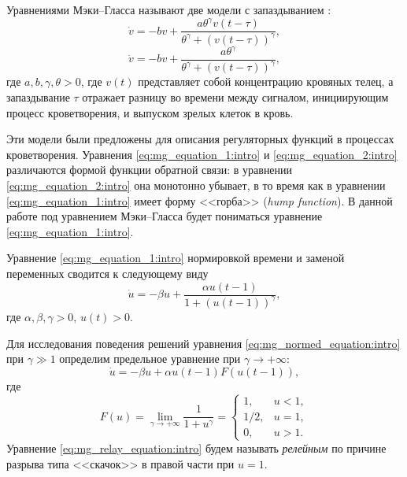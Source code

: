 

{\actuality} Уравнениями Мэки--Гласса называют две модели с запаздыванием \cite{Mackey1977, Glass1988}:
\begin{equation}
	\label{eq:mg_equation_1:intro}
	\dot{v}=-b v+\frac{a \theta^{\gamma} v(t-\tau)}{\theta^{\gamma}+(v(t-\tau))^{\gamma}},
\end{equation}
\begin{equation}
	\label{eq:mg_equation_2:intro}
	\dot{v}=-b v+\frac{a \theta^{\gamma}}{\theta^{\gamma}+(v(t-\tau))^{\gamma}},
\end{equation}
где $a, b, \gamma, \theta > 0$, где $v(t)$ представляет собой концентрацию кровяных телец, а запаздывание $\tau$ отражает разницу во времени между сигналом, инициирующим процесс кроветворения, и выпуском зрелых клеток в кровь.

Эти модели были предложены для описания регуляторных функций в процессах кроветворения. Уравнения \eqref{eq:mg_equation_1:intro} и \eqref{eq:mg_equation_2:intro} различаются формой функции обратной связи: в уравнении \eqref{eq:mg_equation_2:intro} она монотонно убывает, в то время как в уравнении \eqref{eq:mg_equation_1:intro} имеет форму <<горба>> (\emph{hump function}). В данной работе под уравнением Мэки--Гласса будет пониматься уравнение \eqref{eq:mg_equation_1:intro}.

Уравнение \eqref{eq:mg_equation_1:intro} нормировкой времени и заменой переменных сводится к следующему виду
\begin{equation}
	\label{eq:mg_normed_equation:intro}
	\dot{u}=-\beta u+\frac{\alpha u(t-1)}{1 + (u(t-1))^\gamma},
\end{equation}
где $\alpha, \beta, \gamma > 0$, $u(t) > 0$.

Для исследования поведения решений уравнения \eqref{eq:mg_normed_equation:intro} при $\gamma \gg 1$ определим предельное уравнение при $\gamma \to +\infty$:
\begin{equation}
	\label{eq:mg_relay_equation:intro}
	\dot{u}=-\beta u + \alpha u(t-1) F(u(t-1)),
\end{equation}
где
\begin{equation*}
	F(u) = \lim\limits_{\gamma \to +\infty}\dfrac{1}{1 + u^\gamma} = \begin{cases}
		1, & u < 1,\\
		1/2, & u = 1,\\
		0, & u > 1.
	\end{cases}
\end{equation*}
Уравнение \eqref{eq:mg_relay_equation:intro} будем называть \emph{релейным} по причине разрыва типа <<скачок>> в правой части при $u = 1$.

